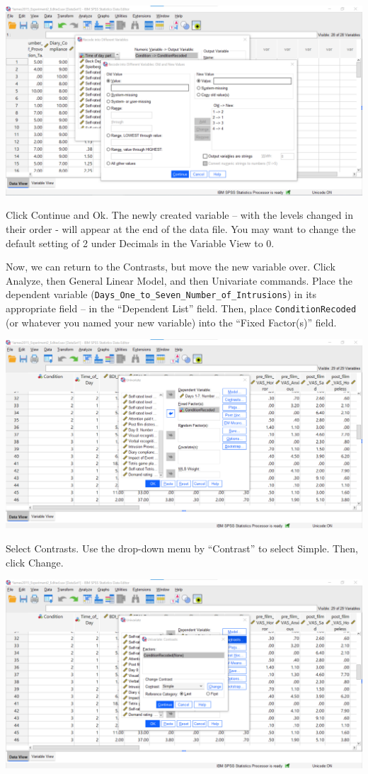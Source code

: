 \documentclass[
]{book}
\begin{document}
\includegraphics{img/8.6.6.43.png}

Click {Continue} and {Ok}. The newly created variable -- with the levels changed in their order - will appear at the end of the data file. You may want to change the default setting of 2 under Decimals in the Variable View to 0.

Now, we can return to the Contrasts, but move the new variable over. Click {Analyze}, then {General Linear Model}, and then {Univariate} commands. Place the dependent variable (\texttt{Days\_One\_to\_Seven\_Number\_of\_Intrusions}) in its appropriate field -- in the ``Dependent List'' field. Then, place \texttt{ConditionRecoded} (or whatever you named your new variable) into the ``Fixed Factor(s)'' field.

\includegraphics{img/8.6.6.44.png}

Select {Contrasts}. Use the drop-down menu by ``Contrast'' to select Simple. Then, click {Change}.

\includegraphics{img/8.6.6.45.png}
\end{document}
